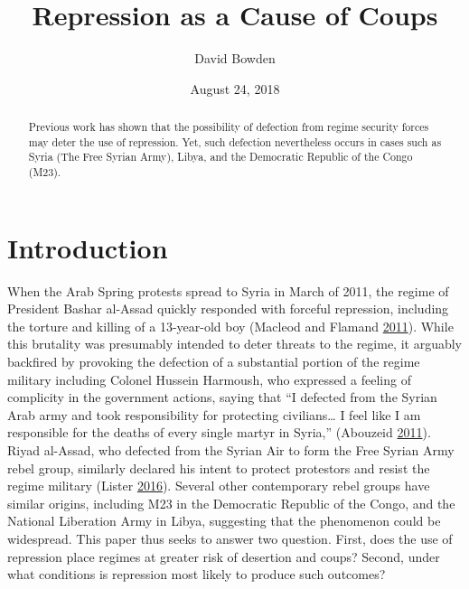 \documentclass[12pt,]{article}
\title{Repression as a Cause of Coups}
\author{David Bowden}
\date{August 24, 2018}
\theoremstyle{definition}
\theoremstyle{definition}
\theoremstyle{definition}
\theoremstyle{remark}
\begin{document}
\maketitle
\begin{abstract}
Previous work has shown that the possibility of defection from regime
security forces may deter the use of repression. Yet, such defection
nevertheless occurs in cases such as Syria (The Free Syrian Army),
Libya, and the Democratic Republic of the Congo (M23).
\end{abstract}

\doublespacing

\hypertarget{introduction}{%
\section{Introduction}\label{introduction}}

When the Arab Spring protests spread to Syria in March of 2011, the
regime of President Bashar al-Assad quickly responded with forceful
repression, including the torture and killing of a 13-year-old boy
(Macleod and Flamand \protect\hyperlink{ref-Macleod2011}{2011}). While
this brutality was presumably intended to deter threats to the regime,
it arguably backfired by provoking the defection of a substantial
portion of the regime military including Colonel Hussein Harmoush, who
expressed a feeling of complicity in the government actions, saying that
``I defected from the Syrian Arab army and took responsibility for
protecting civilians\ldots{} I feel like I am responsible for the deaths
of every single martyr in Syria,'' (Abouzeid
\protect\hyperlink{ref-Abouzeid2011}{2011}). Riyad al-Assad, who
defected from the Syrian Air to form the Free Syrian Army rebel group,
similarly declared his intent to protect protestors and resist the
regime military (Lister \protect\hyperlink{ref-Lister2016}{2016}).
Several other contemporary rebel groups have similar origins, including
M23 in the Democratic Republic of the Congo, and the National Liberation
Army in Libya, suggesting that the phenomenon could be widespread. This
paper thus seeks to answer two question. First, does the use of
repression place regimes at greater risk of desertion and coups? Second,
under what conditions is repression most likely to produce such
outcomes?
\end{document}
